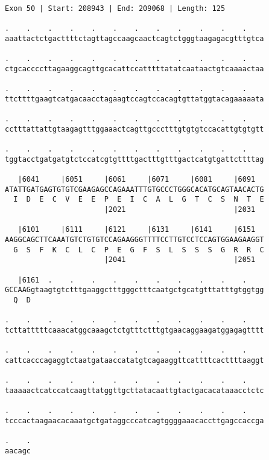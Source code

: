 \documentclass{article}
\begin{document}
\begin{Verbatim}
Exon 50 | Start: 208943 | End: 209068 | Length: 125
 
.    .    .    .    .    .    .    .    .    .    .    .    
aaattactctgacttttctagttagccaagcaactcagtctgggtaagagacgtttgtca
  
.    .    .    .    .    .    .    .    .    .    .    .    
ctgcaccccttagaaggcagttgcacattccatttttatatcaataactgtcaaaactaa
  
.    .    .    .    .    .    .    .    .    .    .    .    
ttcttttgaagtcatgacaacctagaagtccagtccacagtgttatggtacagaaaaata
  
.    .    .    .    .    .    .    .    .    .    .    .    
cctttattattgtaagagtttggaaactcagttgccctttgtgtgtccacattgtgtgtt
  
.    .    .    .    .    .    .    .    .    .    .    .    
tggtacctgatgatgtctccatcgtgttttgactttgtttgactcatgtgattcttttag
  
   |6041     |6051     |6061     |6071     |6081     |6091  
ATATTGATGAGTGTGTCGAAGAGCCAGAAATTTGTGCCCTGGGCACATGCAGTAACACTG
  I  D  E  C  V  E  E  P  E  I  C  A  L  G  T  C  S  N  T  E
                       |2021                         |2031  
  
   |6101     |6111     |6121     |6131     |6141     |6151  
AAGGCAGCTTCAAATGTCTGTGTCCAGAAGGGTTTTCCTTGTCCTCCAGTGGAAGAAGGT
  G  S  F  K  C  L  C  P  E  G  F  S  L  S  S  S  G  R  R  C
                       |2041                         |2051  
  
   |6161  .    .    .    .    .    .    .    .    .    .    
GCCAAGgtaagtgtctttgaaggctttgggctttcaatgctgcatgtttatttgtggtgg
  Q  D                                                      
  
.    .    .    .    .    .    .    .    .    .    .    .    
tcttatttttcaaacatggcaaagctctgtttctttgtgaacaggaagatggagagtttt
  
.    .    .    .    .    .    .    .    .    .    .    .    
cattcacccagaggtctaatgataaccatatgtcagaaggttcattttcacttttaaggt
  
.    .    .    .    .    .    .    .    .    .    .    .    
taaaaactcatccatcaagttatggttgcttatacaattgtactgacacataaacctctc
  
.    .    .    .    .    .    .    .    .    .    .    .    
tcccactaagaacacaaatgctgataggcccatcagtggggaaacaccttgagccaccga
  
.    .
aacagc
\end{Verbatim}
\newpage
\end{document}
